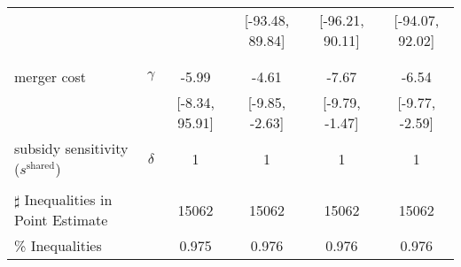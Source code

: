 \begin{tabular}{@{\extracolsep{5pt}}lccccc}
 &  &  & [-93.48, 89.84] & [-96.21, 90.11] & [-94.07, 92.02] \\
 &  &  &  &  &  \\
 &  &  &  &  &  \\
merger cost & $\gamma$ & -5.99 & -4.61 & -7.67 & -6.54 \\
 &  & [-8.34, 95.91] & [-9.85, -2.63] & [-9.79, -1.47] & [-9.77, -2.59] \\
subsidy sensitivity ($s^{\text{shared}}$) & $\delta$ & 1 & 1 & 1 & 1 \\
 &  &  &  &  &  \\
\hline 
$\sharp$ Inequalities in Point Estimate &  & 15062 & 15062 & 15062 & 15062 \\
\% Inequalities &  & 0.975 & 0.976 & 0.976 & 0.976 \\
\bottomrule 
\end{tabular}
